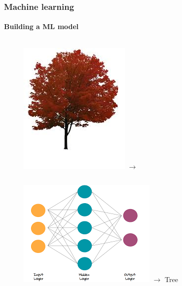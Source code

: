 \documentclass[aspectratio=43]{beamer}
\begin{document}
\begin{frame}

	\frametitle{Machine learning}
	\framesubtitle{Building a ML model}
	
	\begin{figure}

		\begin{columns}
			\includegraphics[width = \linewidth]{tree2.jpeg}
			$\longrightarrow$
		\end{columns}
		\endminipage
		\hspace*{-1.25cm}	
		\includegraphics[width = 1.25\linewidth]{NN.png}
		\endminipage
		\hspace*{0.75cm}
		$\longrightarrow$
		{\color{darkgreen}Tree \checkmark}
		\endminipage


\end{figure}
\end{frame}
\end{document}
